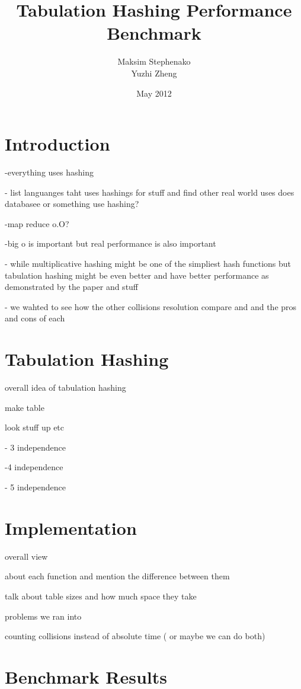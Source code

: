 \documentclass[12pt]{article}
\title{Tabulation Hashing Performance Benchmark}
\author{Maksim Stephenako \\ Yuzhi Zheng}
\date{May 2012}
\begin{document}
\setlength{\baselineskip}{1.25\baselineskip}

\ifpdf
{}
\else
{}
\fi

\maketitle

\section{Introduction}
-everything uses hashing

- list languanges taht uses hashings for stuff
	and find other real world uses does databasee or something use hashing?
	
	-map reduce o.O?

-big o is important  but real performance is also important

- while multiplicative hashing might be one of the simpliest hash functions but tabulation hashing might be even better and have better performance as demonstrated by the paper and stuff

- we wahted to see how the other collisions resolution compare and  and the pros and cons of each


\section{Tabulation Hashing}
overall idea of tabulation hashing

make table

look stuff up etc
 
 - 3 independence
 
 -4 independence

- 5 independence
\section{Implementation}

overall view

about each function and mention the difference between them

talk about table sizes and how much space they take

problems we ran into

counting collisions instead of absolute time ( or maybe we can do both)


\section{Benchmark Results}
\end{document}
